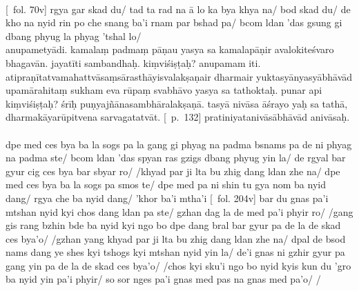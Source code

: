 \documentclass[12pt]{article}
\begin{document}
\textbf{\TVB}\\
{[}\TVB\ fol. 70v{]} rgya gar skad du/ tad ta rad na ā lo ka bya khya na/ bod skad du/ de kho na nyid rin po che snang ba'i rnam par bshad pa/ bcom ldan 'das gsung gi dbang phyug la phyag 'tshal lo/\\

anupametyādi.
kamalaṃ padmaṃ pāṇau yasya sa kamalapāṇir avalokiteśvaro bhagavān.
jayatīti sambandhaḥ.
kiṃviśiṣṭaḥ?
anupamam iti.
atipraṇītatvamahattvāsaṃsārasthāyisvalakṣaṇair\footnoteB{
	°saṃsārasthāyitva°] \MS; °saṃsārasthāyisva°] \EDD\ (\emph{note the two akṣaras}, tva \emph{and} sva, \emph{are very similar})
} dharmair yuktasyānyasyābhāvād upamārahitaṃ sukham eva rūpaṃ svabhāvo yasya sa tathoktaḥ.
punar api kiṃviśiṣṭaḥ?
śrīḥ puṇyajñānasambhāralakṣaṇā.
tasyā nivāsa āśrayo yaḥ sa tathā, dharmakāyarūpitvena\footnoteB{
	dharmakāyarūpitvena] \EDD; dharmakāyarūpatvena \possibleemd\ (\emph{cf. \TVA\ \TVB}: chos kyi sku'i ngo bo nyid kyis)
} sarvagatatvāt. [\EDD\ p.\ 132] pratiniyatanivāsābhāvād anivāsaḥ.\\

\textbf{\TVA}\\
dpe med ces bya ba la sogs pa la gang gi phyag na padma bsnams pa de ni phyag na padma ste/ bcom ldan 'das spyan ras gzigs dbang phyug yin la/ de rgyal bar gyur cig ces bya bar sbyar ro/ /khyad par ji lta bu zhig dang ldan zhe na/ dpe med ces bya ba la sogs pa smos te/ dpe med pa ni shin tu gya nom ba nyid dang/ rgya che ba nyid dang/ 'khor ba'i mtha'i [\TVA\ fol. 204v] bar du gnas pa'i mtshan nyid kyi chos dang ldan pa ste/ gzhan dag la de med pa'i phyir ro/ /gang gis rang bzhin bde ba nyid kyi ngo bo dpe dang bral bar gyur pa de la de skad ces bya'o/ /gzhan yang khyad par ji lta bu zhig dang ldan zhe na/ dpal de bsod nams dang ye shes kyi tshogs kyi mtshan nyid yin la/ de'i gnas ni gzhir gyur pa gang yin pa de la de skad ces bya'o/ /chos kyi sku'i ngo bo nyid kyis kun du 'gro ba nyid yin pa'i phyir/ so sor nges pa'i gnas med pas na gnas med pa'o/ /\\
\end{document}
